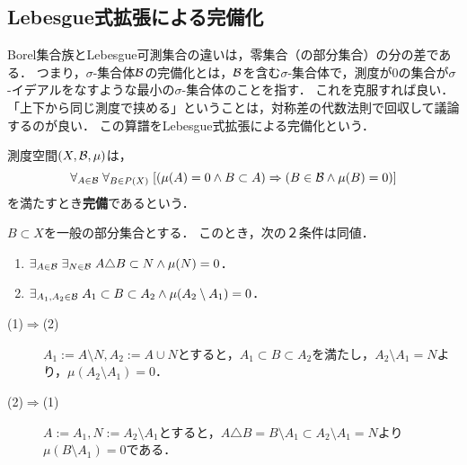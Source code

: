 \documentclass[uplatex, dvipdfmx]{jsreport}
\begin{document}
\subsection{Lebesgue式拡張による完備化}

\begin{tcolorbox}[colframe=ForestGreen, colback=ForestGreen!10!white,breakable,colbacktitle=ForestGreen!40!white,coltitle=black,fonttitle=\bfseries\sffamily,
title=]
    Borel集合族とLebesgue可測集合の違いは，零集合（の部分集合）の分の差である．
    つまり，$\sigma$-集合体$\mathcal{B}$の完備化とは，$\mathcal{B}$を含む$\sigma$-集合体で，測度が$0$の集合が$\sigma$-イデアルをなすような最小の$\sigma$-集合体のことを指す．
    これを克服すれば良い．
    「上下から同じ測度で挟める」ということは，対称差の代数法則で回収して議論するのが良い．
    この算譜をLebesgue式拡張による完備化という．
\end{tcolorbox}

\begin{definition}[complete]
    測度空間$(X,\mathcal{B},\mu)$は，
    \[\forall_{A\in\mathcal{B}}\;\forall_{B\in P(X)}\;[(\mu(A)=0\land B\subset A)\Rightarrow (B\in\mathcal{B}\land\mu(B)=0)]\]
    を満たすとき\textbf{完備}であるという．
\end{definition}

\begin{lemma}[目標の対称差による特徴付け]\label{lemma-completeness}
    $B\subset X$を一般の部分集合とする．
    このとき，次の２条件は同値．
    \begin{enumerate}
        \item $\exists_{A\in\mathcal{B}}\;\exists_{N\in\mathcal{B}}\;A\triangle B\subset N\land\mu(N)=0$．
        \item $\exists_{A_1,A_2\in\mathcal{B}}\;A_1\subset B\subset A_2\land\mu(A_2\setminus A_1)=0$．
    \end{enumerate}
\end{lemma}
\begin{Proof}\mbox{}
    \begin{description}
        \item[(1)$\Rightarrow$(2)] $A_1:=A\setminus N,A_2:=A\cup N$とすると，$A_1\subset B\subset A_2$を満たし，$A_2\setminus A_1=N$より，$\mu(A_2\setminus A_1)=0$．
        \item[(2)$\Rightarrow$(1)] $A:=A_1,N:=A_2\setminus A_1$とすると，$A\triangle B=B\setminus A_1\subset A_2\setminus A_1=N$より$\mu(B\setminus A_1)=0$である．
    \end{description}
\end{Proof}
\end{document}
